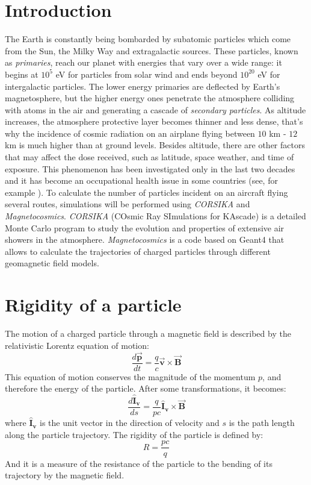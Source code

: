\documentclass[3p,times,twocolumn]{elsarticle}
\begin{document}

\section{Introduction}
\label{sec:introduction}
The Earth is constantly being bombarded by subatomic particles which come from the Sun, the Milky Way and extragalactic sources. These particles, known as \textit{primaries}, reach our planet with energies that vary over a wide range: it begins at $10^5$ eV for particles from solar wind and ends beyond $10^{20}$ eV for intergalactic particles. The lower energy primaries are deflected by  Earth's magnetosphere, but the higher energy ones penetrate the atmosphere colliding with atoms in the air and
generating a cascade of \textit{secondary particles}. As altitude increases, the atmosphere protective layer becomes thinner and less dense, that's why the incidence of cosmic radiation on an airplane flying between $10$ km - $12$ km is much higher than at ground levels. Besides altitude, there are other factors that may affect the dose received, such as latitude, space weather, and time of exposure. This phenomenon has been investigated only in the last two decades and it has become an occupational health issue in some countries (see, for example \cite{bottollier-depois_comparison_2012}). To calculate the number of particles incident on an aircraft flying several routes, simulations will be performed using \textit{CORSIKA} and \textit{Magnetocosmics}. \textit{CORSIKA} (COsmic Ray SImulations for KAscade) \cite{heck_extensive_2010} is a detailed Monte Carlo program to study the evolution and properties of extensive air showers in the atmosphere. \textit{Magnetocosmics} \cite{desorgher_magnetocosmics_2006} is a code based on Geant4 that allows to calculate the trajectories of charged particles through different geomagnetic field models.
\section{Rigidity of a particle}
\label{sec:rigidity_particle}
The motion of a charged particle through a magnetic field is described by the relativistic Lorentz equation of motion:
\begin{equation}
\frac{d\boldsymbol{\vec{p}}}{dt}=\frac{q}{c}\boldsymbol{\vec{v}}\times\boldsymbol{\vec{B}}
\end{equation}
This equation of motion conserves the magnitude of the momentum $p$, and therefore the energy of the particle. After some transformations, it becomes:
\begin{equation}
\frac{d\boldsymbol{\hat{I}_v}}{ds}=\frac{q}{pc}\boldsymbol{\hat{I}_v}\times\boldsymbol{\vec{B}}
\end{equation}
where $\boldsymbol{\hat{I}_v}$ is the unit vector in the direction of velocity and $s$ is the path length along the particle trajectory. The rigidity of the particle is defined by:
\begin{equation}
R=\frac{pc}{q}
\end{equation}
And it is a measure of the resistance of the particle to the bending of its trajectory by the magnetic field.
\end{document}
